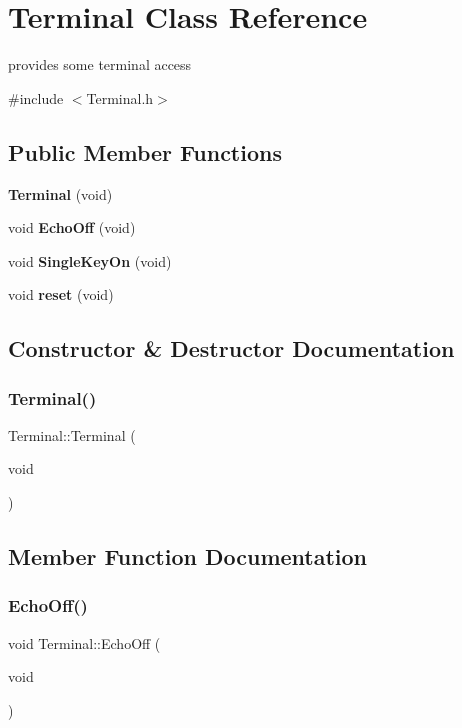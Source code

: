 \section{Terminal Class Reference}
\label{classTerminal}


provides some terminal access  




{\ttfamily \#include $<$Terminal.\+h$>$}

\subsection*{Public Member Functions}
\begin{DoxyCompactItemize}
\item 
\textbf{ Terminal} (void)
\item 
void \textbf{ Echo\+Off} (void)
\item 
void \textbf{ Single\+Key\+On} (void)
\item 
void \textbf{ reset} (void)
\end{DoxyCompactItemize}


\subsection{Constructor \& Destructor Documentation}
\mbox{\label{classTerminal_ae19c02f74a10898de529650afc67a7c3}} 
\subsubsection{Terminal()}
{\footnotesize\ttfamily Terminal\+::\+Terminal (\begin{DoxyParamCaption}\item[{void}]{ }\end{DoxyParamCaption})}



\subsection{Member Function Documentation}
\mbox{\label{classTerminal_a7786961a35e1c72dcbecec6a77bd35ac}} 
\subsubsection{Echo\+Off()}
{\footnotesize\ttfamily void Terminal\+::\+Echo\+Off (\begin{DoxyParamCaption}\item[{void}]{ }\end{DoxyParamCaption})}

